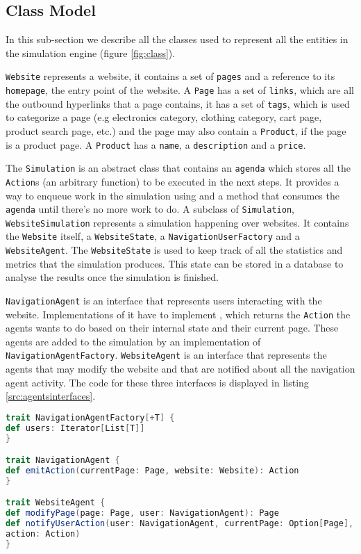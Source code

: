 \subsection{Class Model}

In this sub-section we describe all the classes used to represent all the 
entities in the simulation engine (figure \ref{fig:class}).

\texttt{Website} represents a website, it contains a set of \texttt{pages} and 
a reference to its \texttt{homepage}, the entry point of the website. A 
\texttt{Page} has a set of \texttt{links}, which are all the outbound 
hyperlinks that a page contains, it has a set of \texttt{tags}, which is used 
to categorize a page (e.g electronics category, clothing category, cart page, 
product search page, etc.) and the page may also contain a \texttt{Product}, if 
the page is a product page. A \texttt{Product} has a \texttt{name}, a 
\texttt{description} and a \texttt{price}.

The \texttt{Simulation} is an abstract class that contains an \texttt{agenda} 
which stores all the \texttt{Action}s (an arbitrary function) to be executed in 
the next steps. It provides a way to enqueue work in the simulation using 
 and a  method that consumes 
the \texttt{agenda} until there's no more work to do. A subclass of 
\texttt{Simulation}, \texttt{WebsiteSimulation} represents a simulation 
happening over websites. It contains the \texttt{Website} itself, a 
\texttt{WebsiteState}, a \texttt{NavigationUserFactory} and a 
\texttt{WebsiteAgent}. The \texttt{WebsiteState} is used to keep track of all 
the statistics and metrics that the simulation produces. This state can be 
stored in a database to analyse the results once the simulation is finished.

\texttt{NavigationAgent} is an interface that represents users interacting with 
the website. Implementations of it have to implement , 
which returns the \texttt{Action} the agents wants to do based on their 
internal state and their current page. These agents are added to the simulation 
by an implementation of \texttt{NavigationAgentFactory}. \texttt{WebsiteAgent} 
is an interface that represents the agents that may modify the website and that 
are notified about all the navigation agent activity. The code for these three 
interfaces is displayed in listing \ref{src:agentsinterfaces}.

\begin{lstlisting}[float,language=Scala, label=src:agentsinterfaces, 
caption=Definition of the agents interfaces]
trait NavigationAgentFactory[+T] {
def users: Iterator[List[T]]
}

trait NavigationAgent {
def emitAction(currentPage: Page, website: Website): Action
}

trait WebsiteAgent {
def modifyPage(page: Page, user: NavigationAgent): Page
def notifyUserAction(user: NavigationAgent, currentPage: Option[Page], 
action: Action)
}

\end{lstlisting}

